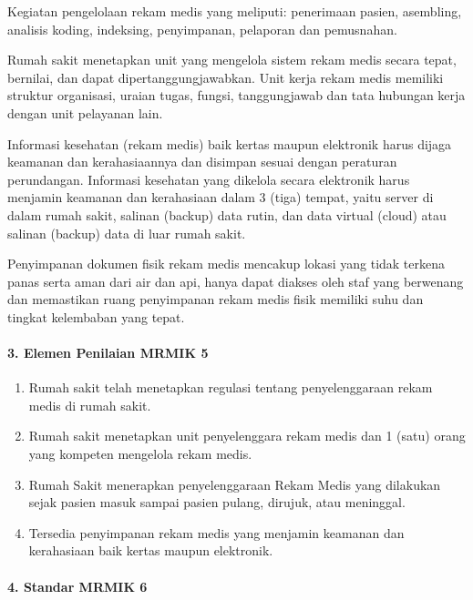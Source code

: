 \documentclass[
]{book}
\providecommand{\tightlist}{%
  \setlength{\itemsep}{0pt}\setlength{\parskip}{0pt}}
\begin{document}
Kegiatan pengelolaan rekam medis yang meliputi: penerimaan pasien, asembling, analisis koding, indeksing, penyimpanan, pelaporan dan pemusnahan.

Rumah sakit menetapkan unit yang mengelola sistem rekam medis secara tepat, bernilai, dan dapat dipertanggungjawabkan. Unit kerja rekam medis memiliki struktur organisasi, uraian tugas, fungsi, tanggungjawab dan tata hubungan kerja dengan unit pelayanan lain.

Informasi kesehatan (rekam medis) baik kertas maupun elektronik harus dijaga keamanan dan kerahasiaannya dan disimpan sesuai dengan peraturan perundangan. Informasi kesehatan yang dikelola secara elektronik harus menjamin keamanan dan kerahasiaan dalam 3 (tiga) tempat, yaitu server di dalam rumah sakit, salinan (backup) data rutin, dan data virtual (cloud) atau salinan (backup) data di luar rumah sakit.

Penyimpanan dokumen fisik rekam medis mencakup lokasi yang tidak terkena panas serta aman dari air dan api, hanya dapat diakses oleh staf yang berwenang dan memastikan ruang penyimpanan rekam medis fisik memiliki suhu dan tingkat kelembaban yang tepat.

\hypertarget{elemen-penilaian-mrmik-5}{%
\paragraph*{3. Elemen Penilaian MRMIK 5}\label{elemen-penilaian-mrmik-5}}

\begin{enumerate}
\def\labelenumi{\alph{enumi}.}
\tightlist
\item
  Rumah sakit telah menetapkan regulasi tentang penyelenggaraan rekam medis di rumah sakit.
\item
  Rumah sakit menetapkan unit penyelenggara rekam medis dan 1 (satu) orang yang kompeten mengelola rekam medis.
\item
  Rumah Sakit menerapkan penyelenggaraan Rekam Medis yang dilakukan sejak pasien masuk sampai pasien pulang, dirujuk, atau meninggal.
\item
  Tersedia penyimpanan rekam medis yang menjamin keamanan dan kerahasiaan baik kertas maupun elektronik.
\end{enumerate}

\hypertarget{standar-mrmik-6}{%
\paragraph*{4. Standar MRMIK 6}\label{standar-mrmik-6}}
\end{document}
